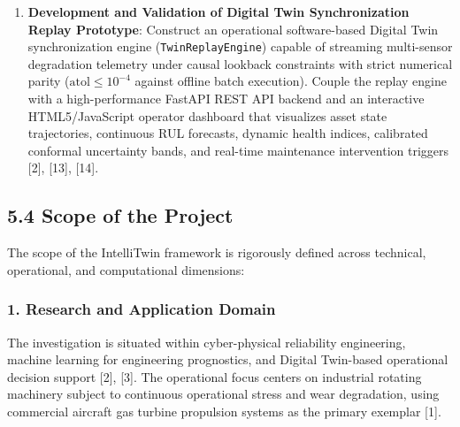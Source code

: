 \documentclass[12pt,a4paper]{article}
\begin{document}
\begin{enumerate}
    \item \textbf{Development and Validation of Digital Twin Synchronization Replay Prototype}: Construct an operational software-based Digital Twin synchronization engine (\texttt{TwinReplayEngine}) capable of streaming multi-sensor degradation telemetry under causal lookback constraints with strict numerical parity ($\text{atol} \le 10^{-4}$ against offline batch execution). Couple the replay engine with a high-performance FastAPI REST API backend and an interactive HTML5/JavaScript operator dashboard that visualizes asset state trajectories, continuous RUL forecasts, dynamic health indices, calibrated conformal uncertainty bands, and real-time maintenance intervention triggers [2], [13], [14].
\end{enumerate}

\subsection*{5.4 Scope of the Project}
The scope of the IntelliTwin framework is rigorously defined across technical, operational, and computational dimensions:

\subsubsection*{1. Research and Application Domain}
The investigation is situated within cyber-physical reliability engineering, machine learning for engineering prognostics, and Digital Twin-based operational decision support [2], [3]. The operational focus centers on industrial rotating machinery subject to continuous operational stress and wear degradation, using commercial aircraft gas turbine propulsion systems as the primary exemplar [1].
\end{document}
